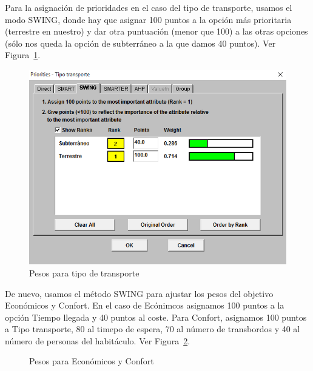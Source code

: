 \documentclass[12pt,a4paper,twoside,openright,titlepage,final]{article}
\begin{document}
Para la asignación de prioridades en el caso del tipo de transporte, usamos el modo SWING, donde hay que asignar 100 puntos a la opción más prioritaria (terrestre en nuestro) y dar otra puntuación (menor que 100) a las otras opciones (sólo nos queda la opción de subterráneo a la que damos 40 puntos). Ver Figura~\ref{fig:prioridades_tipo_transporte}.\\

\begin{figure}[htbp!]
\centering
\includegraphics[width=0.5\linewidth]{imagenes/prioridades_tipo_transporte}
\caption{Pesos para tipo de transporte} \label{fig:prioridades_tipo_transporte}
\end{figure}

De nuevo, usamos el método SWING para ajustar los pesos del objetivo Económicos y Confort. En el caso de Ecónimcos asignamos 100 puntos a la opción Tiempo llegada y 40 puntos al coste. Para Confort, asignamos 100 puntos a Tipo transporte, 80 al timepo de espera, 70 al número de transbordos y 40 al número de personas del habitáculo. Ver Figura~\ref{fig:swing_2}.

\begin{figure}[htbp!]
\centering
{}
\caption{Pesos para Económicos y Confort} \label{fig:swing_2}
\end{figure}
\end{document}
